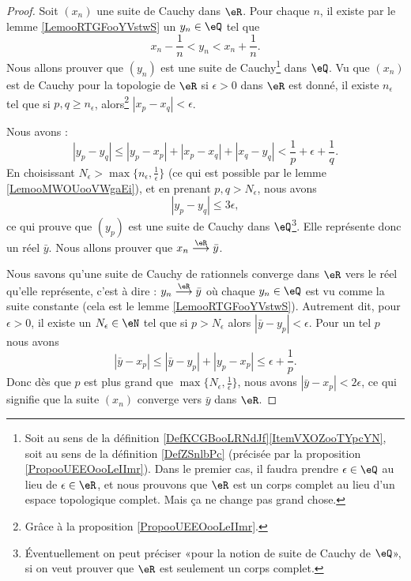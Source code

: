 \begin{proof}
    Soit \( (x_n)\) une suite de Cauchy dans \( \eR\). Pour chaque \( n\), il existe par le lemme \ref{LemooRTGFooYVstwS} un \( y_n\in \eQ\) tel que 
    \begin{equation}
        x_n-\frac{1}{ n }<y_n<x_n+\frac{1}{ n }.
    \end{equation}
    Nous allons prouver que \( (y_n)\) est une suite de Cauchy\footnote{Soit au sens de la définition \ref{DefKCGBooLRNdJf}\ref{ItemVXOZooTYpcYN}, soit au sens de la définition \ref{DefZSnlbPc} (précisée par la proposition \ref{PropooUEEOooLeIImr}). Dans le premier cas, il faudra prendre \( \epsilon\in \eQ\) au lieu de \( \epsilon\in \eR\), et nous prouvons que \( \eR\) est un corps complet au lieu d'un espace topologique complet. Mais ça ne change pas grand chose.} dans \( \eQ\).
    Vu que \( (x_n)\) est de Cauchy pour la topologie de \( \eR\) si \( \epsilon>0\) dans \( \eR\) est donné, il existe \( n_{\epsilon}\) tel que si \( p,q\geq n_{\epsilon}\), alors\footnote{Grâce à la proposition \ref{PropooUEEOooLeIImr}.} \( | x_p-x_q |<\epsilon\).

    Nous avons :
    \begin{equation}
        | y_p-y_q |\leq | y_p-x_p |+| x_p-x_q |+| x_q-y_q |<\frac{1}{ p }+\epsilon+\frac{1}{ q }.
    \end{equation}
    En choisissant \( N_{\epsilon}>\max\{ n_{\epsilon},\frac{1}{ \epsilon } \}\) (ce qui est possible par le lemme \ref{LemooMWOUooVWgaEi}), et en prenant \( p,q>N_{\epsilon}\), nous avons
    \begin{equation}
        | y_p-y_q |\leq 3\epsilon,
    \end{equation}
    ce qui prouve que \( (y_p)\) est une suite de Cauchy dans \( \eQ\)\footnote{Éventuellement on peut préciser «pour la notion de suite de Cauchy de \( \eQ\)», si on veut prouver que \( \eR\) est seulement  un corps complet.}. Elle représente donc un réel \( \bar y\). Nous allons prouver que \(     x_n\stackrel{\eR}{\longrightarrow}\bar y \).

    Nous savons qu'une suite de Cauchy de rationnels converge dans \( \eR\) vers le réel qu'elle représente, c'est à dire : \( y_n\stackrel{\eR}{\longrightarrow}\bar y\) où chaque \( y_n\in \eQ\) est vu comme la suite constante (cela est le lemme \ref{LemooRTGFooYVstwS}). Autrement dit, pour \( \epsilon>0\), il existe un \( N_{\epsilon}\in \eN\) tel que si \( p>N_{\epsilon}\) alors \( | \bar y-y_p |<\epsilon\). Pour un tel \( p\) nous avons
    \begin{equation}
        | \bar y-x_p |\leq| \bar y-y_p |+| y_p-x_p |\leq \epsilon+\frac{1}{ p }.
    \end{equation}
    Donc dès que \( p\) est plus grand que \( \max\{ N_{\epsilon},\frac{1}{ \epsilon } \}\), nous avons \( | \bar y-x_p |<2\epsilon\), ce qui signifie que la suite \( (x_n) \) converge vers \( \bar y\) dans \( \eR\).


\end{proof}
